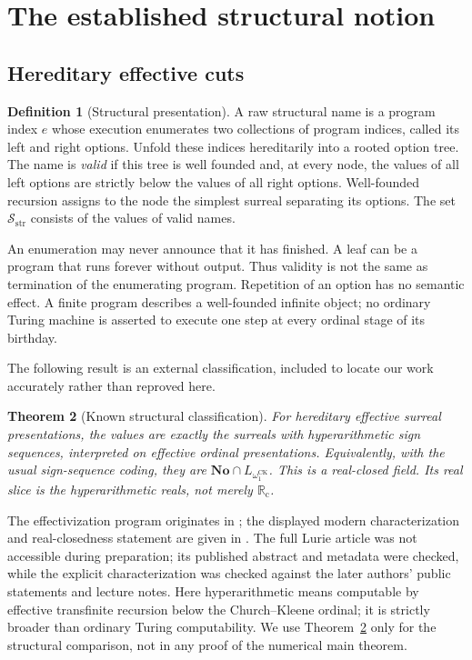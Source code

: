 \documentclass[11pt,letterpaper]{article}
\numberwithin{equation}{section}
\newtheorem{theorem}{Theorem}[section]
\theoremstyle{definition}
\newtheorem{definition}[theorem]{Definition}
\theoremstyle{remark}
\newcommand{\No}{\mathbf{No}}
\newcommand{\Rc}{\mathbb R_{\mathrm c}}
\newcommand{\Sc}{\mathcal S_{\mathrm{str}}}
\newcommand{\CK}{\omega_1^{\mathrm{CK}}}
\begin{document}
\section{The established structural notion}
\label{sec:structural}

\subsection{Hereditary effective cuts}

\begin{definition}[Structural presentation]
\label{def:structural}
A raw structural name is a program index $e$ whose execution enumerates two
collections of program indices, called its left and right options. Unfold
these indices hereditarily into a rooted option tree. The name is
\emph{valid} if this tree is well founded and, at every node, the values of
all left options are strictly below the values of all right options.
Well-founded recursion assigns to the node the simplest surreal separating
its options. The set $\Sc$ consists of the values of valid names.
\end{definition}

An enumeration may never announce that it has finished. A leaf can be a
program that runs forever without output. Thus validity is not the same as
termination of the enumerating program. Repetition of an option has no
semantic effect. A finite program describes a well-founded infinite object;
no ordinary Turing machine is asserted to execute one step at every ordinal
stage of its birthday.

The following result is an external classification, included to locate our
work accurately rather than reproved here.

\begin{theorem}[Known structural classification]
\label{thm:known}
For hereditary effective surreal presentations, the values are exactly the
surreals with hyperarithmetic sign sequences, interpreted on effective
ordinal presentations. Equivalently, with the usual sign-sequence coding,
they are $\No\cap L_{\CK}$. This is a real-closed field. Its real slice is
the hyperarithmetic reals, not merely $\Rc$.
\end{theorem}

The effectivization program originates in
\cite{harkleroad,lurie}; the displayed modern characterization and
real-closedness statement are given in \cite{hamkins,hamkins2025,turetsky}.
The full Lurie article was not accessible during preparation; its published
abstract and metadata were checked, while the explicit characterization
was checked against the later authors' public statements and lecture notes.
Here hyperarithmetic means computable by effective transfinite recursion
below the Church--Kleene ordinal; it is strictly broader than ordinary
Turing computability. We use Theorem~\ref{thm:known} only for the structural
comparison, not in any proof of the numerical main theorem.
\end{document}
